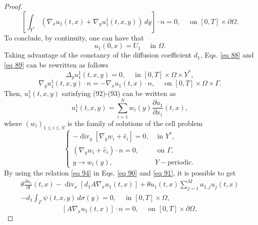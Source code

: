 \begin{proof}
\begin{equation}
 {\left[\int_{Y^{*}}\left(\nabla_{x} u_{1}(t, x)+\nabla_{y} u_{1}^{1}(t, x, y)\right) \, d  y\right] \cdot n=0, \quad \text { on }[0, T] \times \partial \Omega}.
\label{eq 91}\end{equation}
To conclude, by continuity, one can have that
$$
u_{1}(0, x)=U_{1} \quad \text { in } \Omega .
$$
Taking advantage of the constancy of the diffusion coefficient $d_{1}$, Eqs. \eqref{eq 88} and \eqref{eq 89} can be rewritten as follows
\begin{equation}
\Delta_{y} u_{1}^{1}(t, x, y)=0, \quad \text { in }[0, T] \times \Omega \times Y^{*},
\label{eq 92}\end{equation}
\begin{equation}
 \nabla_{y} u_{1}^{1}(t, x, y) \cdot n=-\nabla_{x} u_{1}(t, x) \cdot n, \quad \text { on }[0, T] \times \Omega \times \Gamma.
\label{eq 93}\end{equation}
Then, $u_{1}^{1}(t, x, y)$ satisfying (92)-(93) can be written as
\begin{equation}
 u_{1}^{1}(t, x, y)=\sum_{i=1}^{N} w_{i}(y) \frac{\partial u_{1}}{\partial x_{i}}(t, x),
\label{eq 94}\end{equation}
where $\left(w_{i}\right)_{1 \leq i \leq N}$ is the family of solutions of the cell problem
\begin{equation}
 \begin{cases}-\operatorname{div}_{y}\left[\nabla_{y} w_{i}+\hat{e}_{i}\right]=0, & \text { in } Y^{*}, \\ \left(\nabla_{y} w_{i}+\hat{e}_{i}\right) \cdot n=0, & \text { on } \Gamma, \\ y \rightarrow w_{i}(y), & Y-\text {periodic}. \end{cases}
\label{eq 95}\end{equation}
By using the relation \eqref{eq 94} in Eqs. \eqref{eq 90} and \eqref{eq 91}, it is possible to get
\begin{equation}
 \begin{split}
    \theta \frac{\partial u_{1}}{\partial t}(t, x)-\operatorname{div}_{x}\left[d_{1} A \nabla_{x} u_{1}(t, x)\right]+\theta u_{1}(t, x) \sum_{j=1}^{M} a_{1, j} u_{j}(t, x) \\
   -d_{1} \int_{\Gamma} \psi(t, x, y) \, d  \sigma(y)=0, \quad \text { in }[0, T] \times \Omega,
 \end{split}
\label{eq 96}\end{equation}
\begin{equation}
 \left[A \nabla_{x} u_{1}(t, x)\right] \cdot n=0, \quad \text { on }[0, T] \times \partial \Omega,

\end{equation}
\end{proof}
